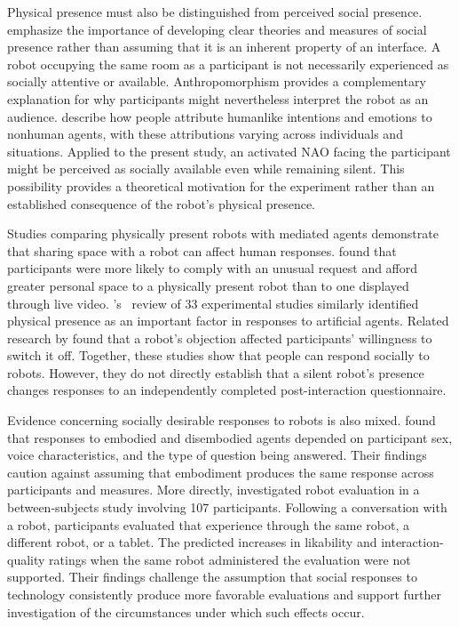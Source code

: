 \documentclass[sigconf,nonacm]{acmart}
\begin{document}
Physical presence must also be distinguished from perceived social presence. \citet{biocca2003} emphasize the importance of developing clear theories and measures of social presence rather than assuming that it is an inherent property of an interface. A robot occupying the same room as a participant is not necessarily experienced as socially attentive or available. Anthropomorphism provides a complementary explanation for why participants might nevertheless interpret the robot as an audience. \citet{epley2007} describe how people attribute humanlike intentions and emotions to nonhuman agents, with these attributions varying across individuals and situations. Applied to the present study, an activated NAO facing the participant might be perceived as socially available even while remaining silent. This possibility provides a theoretical motivation for the experiment rather than an established consequence of the robot's physical presence.

Studies comparing physically present robots with mediated agents demonstrate that sharing space with a robot can affect human responses. \citet{bainbridge2011} found that participants were more likely to comply with an unusual request and afford greater personal space to a physically present robot than to one displayed through live video. \citeauthor{li2015}'s~\cite{li2015} review of 33 experimental studies similarly identified physical presence as an important factor in responses to artificial agents. Related research by \citet{horstmann2018} found that a robot's objection affected participants' willingness to switch it off. Together, these studies show that people can respond socially to robots. However, they do not directly establish that a silent robot's presence changes responses to an independently completed post-interaction questionnaire.

Evidence concerning socially desirable responses to robots is also mixed. \citet{crowell2009} found that responses to embodied and disembodied agents depended on participant sex, voice characteristics, and the type of question being answered. Their findings caution against assuming that embodiment produces the same response across participants and measures. More directly, \citet{leichtmann2021} investigated robot evaluation in a between-subjects study involving 107 participants. Following a conversation with a robot, participants evaluated that experience through the same robot, a different robot, or a tablet. The predicted increases in likability and interaction-quality ratings when the same robot administered the evaluation were not supported. Their findings challenge the assumption that social responses to technology consistently produce more favorable evaluations and support further investigation of the circumstances under which such effects occur.
\end{document}
